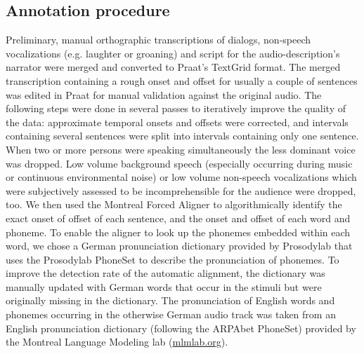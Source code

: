 \documentclass[10pt,a4paper,onecolumn]{article}
\begin{document}
\subsection*{Annotation procedure}
Preliminary, manual orthographic transcriptions of dialogs, non-speech
vocalizations (e.g. laughter or groaning) and script for the audio-description's
narrator were merged and converted to Praat's \citep{boersma2019praat} TextGrid
format.
The merged transcription containing a rough onset and offset for usually a
couple of sentences was edited in Praat for manual validation against the
original audio.
The following steps were done in several passes to iteratively improve the
quality of the data: approximate temporal onsets and offsets were corrected, and
intervals containing several sentences were split into intervals containing only
one sentence.
When two or more persons were speaking simultaneously the less dominant voice
was dropped. Low volume background speech (especially occurring during music or
continuous environmental noise) or low volume non-speech vocalizations which
were subjectively assessed to be incomprehensible for the audience were dropped,
too.
We then used the Montreal Forced Aligner \citep{mcauliffe2017montreal} to
algorithmically identify the exact onset of offset of each sentence, and the
onset and offset of each word and phoneme.
To enable the aligner to look up the phonemes embedded within each word, we
chose a German pronunciation dictionary provided by Prosodylab \citep
{gorman2011prosodylab} that uses the Prosodylab PhoneSet to describe the
pronunciation of phonemes.
To improve the detection rate of the automatic alignment, the dictionary was
manually updated with German words that occur in the stimuli but were originally
missing in the dictionary.
The pronunciation of English words and phonemes occurring in the otherwise
German audio track was taken from an English pronunciation dictionary (following
the ARPAbet PhoneSet) provided by the Montreal Language Modeling lab
(\href{http://mlmlab.org/mfa/dictionaries/english.dict}{mlmlab.org}).
\end{document}
